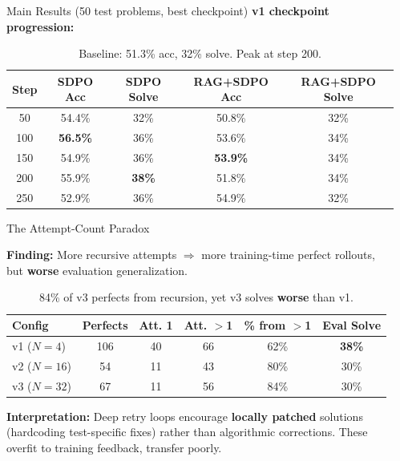 \documentclass[final]{beamer}
\newlength{\sepwidth}
\newlength{\colwidth}
\begin{document}
\begin{frame}[t]
\begin{columns}[t]
\begin{column}{\colwidth}
\begin{block}{Main Results (50 test problems, best checkpoint)}
\textbf{v1 checkpoint progression:}
\begin{table}
\centering
\small
\begin{tabular}{ccccc}
\toprule
\textbf{Step} & \textbf{SDPO Acc} & \textbf{SDPO Solve} & \textbf{RAG+SDPO Acc} & \textbf{RAG+SDPO Solve}\\
\midrule
50 & 54.4\% & 32\% & 50.8\% & 32\%\\
100 & \textbf{56.5\%} & 36\% & 53.6\% & 34\%\\
150 & 54.9\% & 36\% & \textbf{53.9\%} & 34\%\\
200 & 55.9\% & \textbf{38\%} & 51.8\% & 34\%\\
250 & 52.9\% & 36\% & 54.9\% & 32\%\\
\bottomrule
\end{tabular}
\caption*{\scriptsize Baseline: 51.3\% acc, 32\% solve. Peak at step 200.}
\end{table}

\end{block}

\begin{block}{The Attempt-Count Paradox}

\textbf{Finding:} More recursive attempts $\Rightarrow$ more training-time perfect rollouts, but \textbf{worse} evaluation generalization.

\begin{table}
\centering
\small
\begin{tabular}{lccccc}
\toprule
\textbf{Config} & \textbf{Perfects} & \textbf{Att. 1} & \textbf{Att. $>$1} & \textbf{\% from $>$1} & \textbf{Eval Solve}\\
\midrule
v1 ($N{=}4$) & 106 & 40 & 66 & 62\% & \textbf{38\%}\\
v2 ($N{=}16$) & 54 & 11 & 43 & 80\% & 30\%\\
v3 ($N{=}32$) & 67 & 11 & 56 & 84\% & 30\%\\
\bottomrule
\end{tabular}
\caption*{\scriptsize 84\% of v3 perfects from recursion, yet v3 solves \textbf{worse} than v1.}
\end{table}

\textbf{Interpretation:} Deep retry loops encourage \textbf{locally patched} solutions (hardcoding test-specific fixes) rather than algorithmic corrections. These overfit to training feedback, transfer poorly.

\end{block}

\end{column}
\begin{column}{\sepwidth}\end{column}


\end{columns}
\end{frame}
\end{document}
